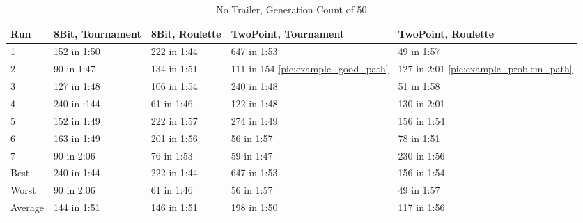 \begin{table}[H]\caption{No Trailer, Generation Count of 50}
\begin{center}
	\begin{tabular}{| l | l | l | p{3cm} | p{3cm}|}
		\hline
		Run 		& 8Bit, Tournament 	& 8Bit, Roulette 	& TwoPoint, Tournament 	& TwoPoint, Roulette	\\ \hline
		1				&	152 in 1:50				&	222 in 1:44			&	647 in 1:53						&	49 in 1:57					\\ \hline
		2				&	90 in 1:47				&	134 in 1:51			& 111 in 154 \ref{pic:example_good_path}			&	127 in 2:01 \ref{pic:example_problem_path}	\\ \hline		
		3				&	127 in 1:48				&	106 in 1:54			& 240 in 1:48						& 51 in 1:58					\\ \hline
		4				&	240 in :144				&	61 in 1:46			& 122 in 1:48						& 130 in 2:01					\\ \hline
		5				&	152 in 1:49				&	222 in 1:57			&	274 in 1:49						&	156 in 1:54					\\ \hline
		6				&	163 in 1:49				& 201 in 1:56			&	56 in 1:57						& 78 in 1:51					\\ \hline
		7				&	90 in 2:06				&	76 in 1:53			& 59 in 1:47						& 230 in 1:56					\\ \hline
		Best		&	240 in 1:44				&	222 in 1:44			&	647 in 1:53						&	156 in 1:54					\\ \hline
		Worst		&	90 in 2:06				&	61 in 1:46			&	56 in 1:57						& 49 in 1:57					\\ \hline
		Average	&	144 in 1:51				& 146 in 1:51			& 198 in 1:50						&	117 in 1:56					\\ \hline
		\hline
	\end{tabular}
\end{center}
\end{table}


